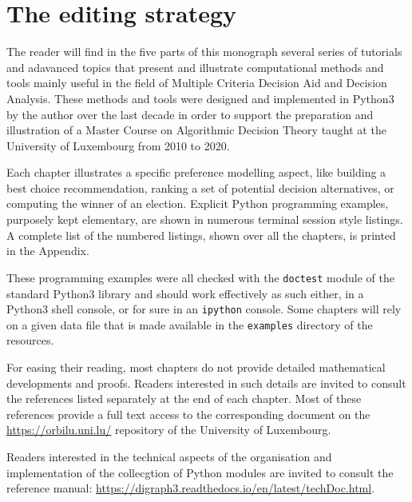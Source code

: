 \label{sec:0}



\section{The editing strategy}
\label{sec:0.1}

The reader will find in the five parts of this monograph several series of tutorials and adavanced topics that present and illustrate computational methods and tools mainly useful in the field of Multiple Criteria Decision Aid and Decision Analysis. These methods and tools were designed and implemented in Python3 by the author over the last decade in order to support the preparation and illustration of a Master Course on Algorithmic Decision Theory taught at the University of Luxembourg from 2010 to 2020.

Each chapter illustrates a specific preference modelling aspect, like building a best choice recommendation, ranking a set of potential decision alternatives, or computing the winner of an election. Explicit Python programming examples, purposely kept elementary, are shown in numerous terminal session style listings. A complete list of the numbered listings, shown over all the chapters, is printed in the Appendix. 

These programming examples were all checked with the \texttt{doctest} module of the standard Python3 library and should work effectively as such either, in a Python3 shell console, or for sure in an \texttt{ipython} console. Some chapters will rely on a given data file that is made available in the \texttt{examples} directory of the \Digraph resources. 

For easing their reading, most chapters do not provide detailed mathematical developments and proofs. Readers interested in such details are invited to consult the references listed separately at the end of each chapter. Most of these references provide a full text access to the corresponding document on the \href{https://orbilu.uni.lu/}{https://orbilu.uni.lu/} repository of the University of Luxembourg.

Readers interested in the technical aspects of the organisation and implementation of the collecgtion of \Digraph Python modules are invited to consult the reference manual: \href{https://digraph3.readthedocs.io/en/latest/techDoc.html}{https://digraph3.readthedocs.io/en/latest/techDoc.html}.

